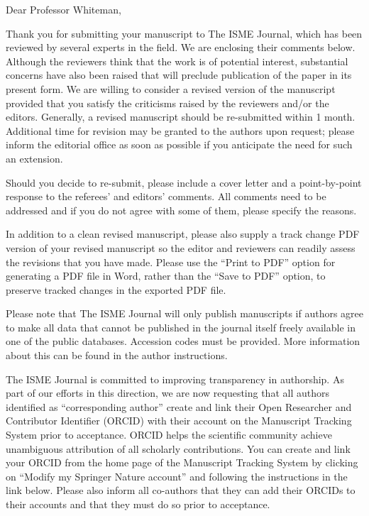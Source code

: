 \documentclass[11pt,]{article}
\begin{document}
\begin{blockquote}
Dear Professor Whiteman,

Thank you for submitting your manuscript to The ISME Journal, which has
been reviewed by several experts in the field. We are enclosing their
comments below. Although the reviewers think that the work is of
potential interest, substantial concerns have also been raised that will
preclude publication of the paper in its present form. We are willing to
consider a revised version of the manuscript provided that you satisfy
the criticisms raised by the reviewers and/or the editors. Generally, a
revised manuscript should be re-submitted within 1 month. Additional
time for revision may be granted to the authors upon request; please
inform the editorial office as soon as possible if you anticipate the
need for such an extension.

Should you decide to re-submit, please include a cover letter and a
point-by-point response to the referees' and editors' comments. All
comments need to be addressed and if you do not agree with some of them,
please specify the reasons.

In addition to a clean revised manuscript, please also supply a track
change PDF version of your revised manuscript so the editor and
reviewers can readily assess the revisions that you have made. Please
use the ``Print to PDF'' option for generating a PDF file in Word,
rather than the ``Save to PDF'' option, to preserve tracked changes in
the exported PDF file.

Please note that The ISME Journal will only publish manuscripts if
authors agree to make all data that cannot be published in the journal
itself freely available in one of the public databases. Accession codes
must be provided. More information about this can be found in the author
instructions.

The ISME Journal is committed to improving transparency in authorship.
As part of our efforts in this direction, we are now requesting that all
authors identified as ``corresponding author'' create and link their
Open Researcher and Contributor Identifier (ORCID) with their account on
the Manuscript Tracking System prior to acceptance. ORCID helps the
scientific community achieve unambiguous attribution of all scholarly
contributions. You can create and link your ORCID from the home page of
the Manuscript Tracking System by clicking on ``Modify my Springer
Nature account'' and following the instructions in the link below.
Please also inform all co-authors that they can add their ORCIDs to
their accounts and that they must do so prior to acceptance.


\end{blockquote}
\end{document}
